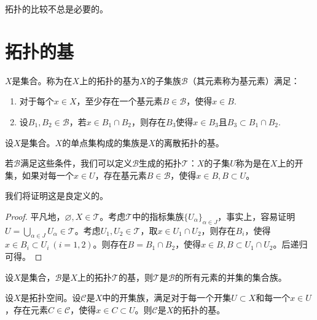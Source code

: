 \documentclass{article}
\newcommand{\cT}{\mathcal{T}}
\begin{document}
拓扑的比较不总是必要的。


\section{拓扑的基}

\begin{definition}
    \(X\)是集合。称为在\(X\)上的拓扑的基为\(X\)的子集族\(\mathcal{B}\)（其元素称为基元素）满足：
    \begin{enumerate}[label=\arabic*.]
        \item 对于每个\(x\in X\)，至少存在一个基元素\(B\in \mathcal{B}\)，使得\(x\in B\).
        \item 设\(B_1,B_2\in\mathcal{B}\)，若\(x \in B_1\cap B_2 \)，则存在\(B_3\)使得\(x\in B_3\)且\(B_3 \subset B_1\cap B_2\).
    \end{enumerate}
\end{definition}

\begin{example}
    设\(X\)是集合。\(X\)的单点集构成的集族是\(X\)的离散拓扑的基。
\end{example}
\begin{definition}
    
若\(\mathcal{B}\)满足这些条件，我们可以定义\(\mathcal{B}\)生成的拓扑\(\cT\)：\(X\)的子集\(U\)称为是在\(X\)上的开集，如果对每一个\(x\in U\)，存在基元素\(B\in \mathcal{B}\)，使得\(x\in B,B\subset U\)。
\end{definition}
我们将证明这是良定义的。
\begin{proof}
    平凡地，\(\varnothing,X \in \cT\)。考虑\(\cT\)中的指标集族\(\{U_\alpha\}_{\alpha\in J}\)，事实上，容易证明\(
    U=\bigcup_{\alpha\in J} U_\alpha \in \cT
    \)。考虑\(U_1,U_2\in \mathcal{T}\)，取\(x\in U_1\cap U_2\)，则存在\(B_i\)，使得\(x\in B_i\subset U_i~(i=1,2)\)。则存在\(B=B_1\cap B_2\)，使得\(x\in B,B\subset U_1\cap U_2\)。后递归可得。
\end{proof}



\begin{lemma}
    设\(X\)是集合，\(\mathcal{B}\)是\(X\)上的拓扑\(\cT\)的基，则\(\cT\)是\(\mathcal{B}\)的所有元素的并集的集合族。
\end{lemma}

\begin{lemma}
    设\(X\)是拓扑空间。设\(\mathcal{C}\)是\(X\)中的开集族，满足对于每一个开集\(U\subset X\)和每一个\(x\in U\)，存在元素\(C\in \mathcal{C}\)，使得\(x\in C\subset U\)。则\(\mathcal{C}\)是\(X\)的拓扑的基。
\end{lemma}
\end{document}

